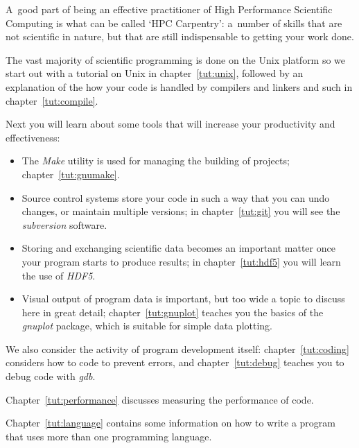 
A~good part of being an effective practitioner
of High Performance Scientific Computing is
what can be called `HPC Carpentry':
a~number of skills that are not scientific in nature,
but that are still indispensable to getting your work done.

The vast majority of
scientific programming is done on the Unix platform so we start out
with a tutorial on Unix in chapter~\ref{tut:unix}, followed by an
explanation of the how your code is handled by compilers and linkers
and such in chapter~\ref{tut:compile}.

Next you will learn about some tools that will increase your
productivity and effectiveness: 
\begin{itemize}
\item The \emph{Make} utility is used for managing the building of
  projects; chapter~\ref{tut:gnumake}.
\item Source control systems store your code in such a way that you
  can undo changes, or maintain multiple versions; in
  chapter~\ref{tut:git} you will see the \emph{subversion} software.
\item Storing and exchanging scientific data becomes an important
  matter once your program starts to produce results; in
  chapter~\ref{tut:hdf5} you will learn the use of \emph{HDF5}.
\item Visual output of program data is important, but too wide a topic
  to discuss here in great detail; chapter~\ref{tut:gnuplot} teaches
  you the basics of the \emph{gnuplot} package, which is suitable for
  simple data plotting.
\end{itemize}

We also consider the activity of program development itself:
chapter~\ref{tut:coding} considers how to code to prevent errors, and
chapter~\ref{tut:debug} teaches you to debug code with
\emph{gdb}. 
\begin{notready}
Chapter~\ref{tut:performance} discusses measuring the
performance of code.
\end{notready}
Chapter~\ref{tut:language} contains some information on
how to write a program that uses more than one programming language.

